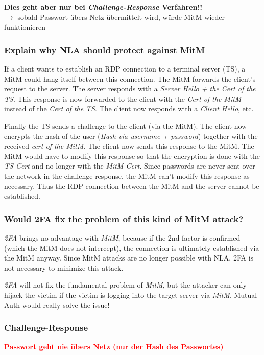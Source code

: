 \textbf{Dies geht aber nur bei \textit{Challenge-Response} Verfahren!!}\\
$\rightarrow$ sobald Passwort übers Netz übermittelt wird, würde MitM wieder funktionieren

\subsubsection{Explain why NLA should protect against MitM}
If a client wants to establish an RDP connection to a terminal server (TS), a MitM could hang itself between this connection.
The MitM forwards the client's request to the server. The server responds with a \textit{Server Hello + the Cert of the TS}. This response is now forwarded to the client with the \textit{Cert of the MitM} instead of the \textit{Cert of the TS}. The client now responds with a \textit{Client Hello}, etc.

Finally the TS sends a challenge to the client (via the MitM). The client now encrypts the hash of the user (\textit{Hash via username + password}) together with the received \textit{cert of the MitM}. The client now sends this response to the MitM. The MitM would have to modify this response so that the encryption is done with the \textit{TS-Cert} and no longer with the \textit{MitM-Cert}. Since passwords are never sent over the network in the challenge response, the MitM can't modify this response as necessary.
Thus the RDP connection between the MitM and the server cannot be established.


\subsubsection{Would 2FA fix the problem of this kind of MitM attack?}
\textit{2FA} brings no advantage with \textit{MitM}, because if the 2nd factor is confirmed (which the MitM does not intercept), the connection is ultimately established via the MitM anyway.
Since MitM attacks are no longer possible with NLA, 2FA is not necessary to minimize this attack.

\textit{2FA} will not fix the fundamental problem of \textit{MitM}, but the attacker can only hijack the victim if the victim is logging into the target server via \textit{MitM}. Mutual Auth would really solve the issue!

\subsubsection{Challenge-Response}
\textcolor{red}{\textbf{Passwort geht nie übers Netz (nur der Hash des Passwortes)}}\\

